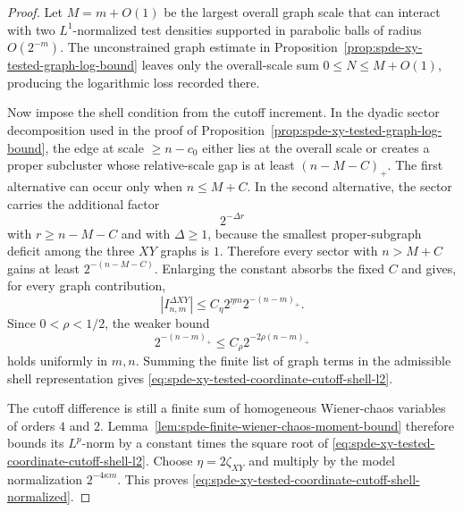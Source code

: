 \begin{proof}
Let \(M=m+O(1)\) be the largest overall graph scale that can interact with
two \(L^1\)-normalized test densities supported in parabolic balls of radius
\(O(2^{-m})\).  The unconstrained graph estimate in
Proposition~\ref{prop:spde-xy-tested-graph-log-bound} leaves only the
overall-scale sum \(0\leq N\leq M+O(1)\), producing the logarithmic loss
recorded there.

Now impose the shell condition from the cutoff increment.  In the dyadic
sector decomposition used in the proof of
Proposition~\ref{prop:spde-xy-tested-graph-log-bound}, the edge at scale
\(\geq n-c_0\) either lies at the overall scale or creates a proper
subcluster whose relative-scale gap is at least
\((n-M-C)_+\).  The first alternative can occur only when
\(n\leq M+C\).  In the second alternative, the sector carries the additional
factor
\[
  2^{-\Delta r}
\]
with \(r\geq n-M-C\) and with
\(\Delta\geq1\), because the smallest proper-subgraph deficit among the
three \(XY\) graphs is \(1\).  Therefore every sector with \(n>M+C\) gains
at least \(2^{-(n-M-C)}\).  Enlarging the constant absorbs the fixed \(C\)
and gives, for every graph contribution,
\[
  |I_{n,m}^{\Delta XY}|
  \leq
  C_\eta 2^{\eta m}2^{-(n-m)_+}.
\]
Since \(0<\rho<1/2\), the weaker bound
\[
  2^{-(n-m)_+}
  \leq C_\rho 2^{-2\rho(n-m)_+}
\]
holds uniformly in \(m,n\).  Summing the finite list of graph terms in the
admissible shell representation gives
\eqref{eq:spde-xy-tested-coordinate-cutoff-shell-l2}.

The cutoff difference is still a finite sum of homogeneous Wiener-chaos
variables of orders \(4\) and \(2\).  Lemma~\ref{lem:spde-finite-wiener-chaos-moment-bound}
therefore bounds its \(L^p\)-norm by a constant times the square root of
\eqref{eq:spde-xy-tested-coordinate-cutoff-shell-l2}.  Choose
\(\eta=2\zeta_{XY}\) and multiply by the model normalization
\(2^{-4\kappa m}\).  This proves
\eqref{eq:spde-xy-tested-coordinate-cutoff-shell-normalized}.
\end{proof}

